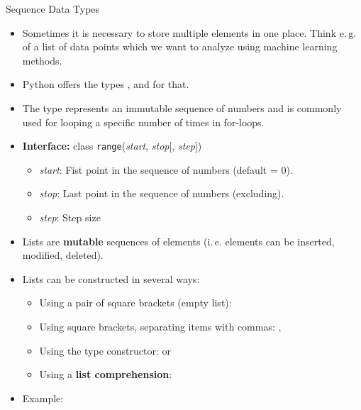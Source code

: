 \begin{frame}
	
\end{frame}


\begin{dwHeaderFrame}{Sequence Data Types}
	\begin{itemize}
		\item Sometimes it is necessary to store multiple elements in one place.
			Think e.\,g. of a list of data points which we want to analyze using machine learning methods.
		\item Python offers the types ,  and  for that. 
	\end{itemize}
	
	\begin{itemize}
		\item The  type represents an immutable sequence of numbers and is commonly used for looping a specific number of times in for-loops.
		\item \textbf{Interface:} class \texttt{range}(\textit{start}, \textit{stop}[, \textit{step}])
		\begin{itemize}
			\item \textit{start}: Fist point in the sequence of numbers (default = 0).
			\item \textit{stop}: Last point in the sequence of numbers (excluding).
			\item \textit{step}: Step size
		\end{itemize}
	\end{itemize}
\end{dwHeaderFrame}
	
	
\begin{frame}
	\begin{itemize}
		\item Lists are \textbf{mutable} sequences of elements (i.\,e. elements can be inserted, modified, deleted).
		\item Lists can be constructed in several ways:
		\begin{itemize}
			\item Using a pair of square brackets (empty list): \code{[]}
			\item Using square brackets, separating items with commas: \code{[a]}, \code{[a, b, c]}
			\item Using the type constructor:  or 
			\item Using a \textbf{list comprehension}: 
		\end{itemize}
		\item Example: 
	\end{itemize}
	
\end{frame}


